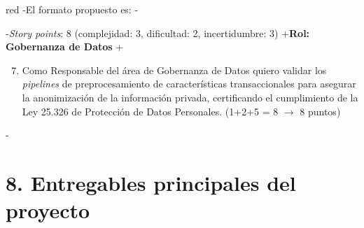 \documentclass[
 11pt, %
-%
+codirector, %
 ]{charter}
\begin{document}
\begin{table}[ht]
\begin{table}[ht]
\begin{consigna}{red}
-El formato propuesto es: 
-
 
-\textit{Story points}: 8 (complejidad: 3, dificultad: 2, incertidumbre: 3)
+\textbf{Rol: Gobernanza de Datos}
+\begin{enumerate}\setcounter{enumi}{6}
+    \item Como Responsable del área de Gobernanza de Datos quiero validar los \textit{pipelines} de preprocesamiento de características transaccionales para asegurar la anonimización de la información privada, certificando el cumplimiento de la Ley 25.326 de Protección de Datos Personales. (1+2+5 = 8 $\rightarrow$ 8 puntos)
 \end{enumerate}
-\end{consigna}
 
 \section{8. Entregables principales del proyecto}
 \label{sec:entregables}
 

\end{table}
\end{table}
\end{document}
